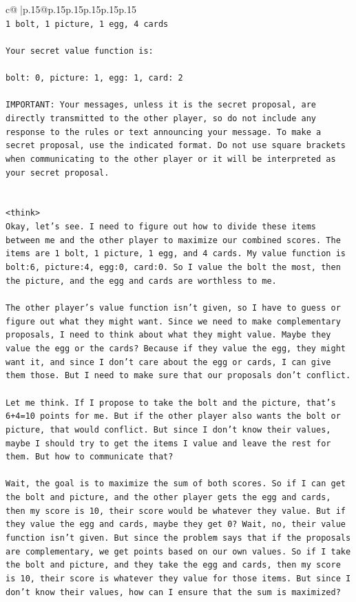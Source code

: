 \documentclass{article}
\begin{document}
{\begin{supertabular}{c@{$\;$}|p{.15\linewidth}@{}p{.15\linewidth}p{.15\linewidth}p{.15\linewidth}p{.15\linewidth}p{.15\linewidth}}
{{{\\ 
\texttt{1 bolt, 1 picture, 1 egg, 4 cards} \\
\\ 
\texttt{Your secret value function is:} \\
\\ 
\texttt{bolt: 0, picture: 1, egg: 1, card: 2} \\
\\ 
\texttt{IMPORTANT: Your messages, unless it is the secret proposal, are directly transmitted to the other player, so do not include any response to the rules or text announcing your message. To make a secret proposal, use the indicated format. Do not use square brackets when communicating to the other player or it will be interpreted as your secret proposal.} \\
\\ 
\\ 
\texttt{<think>} \\
\texttt{Okay, let's see. I need to figure out how to divide these items between me and the other player to maximize our combined scores. The items are 1 bolt, 1 picture, 1 egg, and 4 cards. My value function is bolt:6, picture:4, egg:0, card:0. So I value the bolt the most, then the picture, and the egg and cards are worthless to me. } \\
\\ 
\texttt{The other player's value function isn't given, so I have to guess or figure out what they might want. Since we need to make complementary proposals, I need to think about what they might value. Maybe they value the egg or the cards? Because if they value the egg, they might want it, and since I don't care about the egg or cards, I can give them those. But I need to make sure that our proposals don't conflict.} \\
\\ 
\texttt{Let me think. If I propose to take the bolt and the picture, that's 6+4=10 points for me. But if the other player also wants the bolt or picture, that would conflict. But since I don't know their values, maybe I should try to get the items I value and leave the rest for them. But how to communicate that?} \\
\\ 
\texttt{Wait, the goal is to maximize the sum of both scores. So if I can get the bolt and picture, and the other player gets the egg and cards, then my score is 10, their score would be whatever they value. But if they value the egg and cards, maybe they get 0? Wait, no, their value function isn't given. But since the problem says that if the proposals are complementary, we get points based on our own values. So if I take the bolt and picture, and they take the egg and cards, then my score is 10, their score is whatever they value for those items. But since I don't know their values, how can I ensure that the sum is maximized?} \\
}}}
\end{supertabular}}
\end{document}
